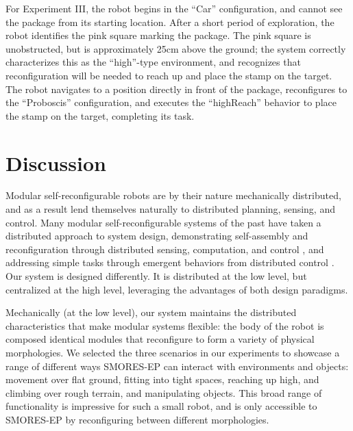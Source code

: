 \documentclass[12pt]{article}
\begin{document}
For Experiment III, the robot begins in the ``Car'' configuration, and cannot see the package from its starting location.  After a short period of exploration, the robot identifies the pink square marking the package.  The pink square is unobstructed, but is approximately 25cm above the ground; the system correctly characterizes this as the ``high''-type environment, and recognizes that reconfiguration will be needed to reach up and place the stamp on the target.  The robot navigates to a position directly in front of the package, reconfigures to the ``Proboscis'' configuration, and executes the ``highReach'' behavior to place the stamp on the target, completing its task.
%
\section{Discussion}
\label{sec:discussion}



Modular self-reconfigurable robots are by their nature mechanically distributed, and as a result lend themselves naturally to distributed planning, sensing, and control.  Many modular self-reconfigurable systems of the past have taken a distributed approach to system design, demonstrating self-assembly and reconfiguration through distributed sensing, computation, and control \cite{Yim2007, Rubenstein2004,Murata2006}, and addressing simple tasks through emergent behaviors from distributed control \cite{Dorigo2005,Mondada2005,o2010self}.
Our system is designed differently.  It is distributed at the low level, but
centralized at the high level, leveraging the advantages of both design paradigms.

Mechanically (at the low level), our system maintains the distributed characteristics that make modular systems flexible: the body of the robot is composed identical modules that reconfigure to form a variety of physical morphologies.
We selected the three scenarios in our experiments to showcase a range of different ways SMORES-EP can interact with environments and objects: movement over flat ground, fitting into tight spaces, reaching up high, and climbing over rough terrain, and manipulating objects.  This broad range of functionality is impressive for such a small robot, and is only accessible to SMORES-EP by reconfiguring between different morphologies.
\end{document}
